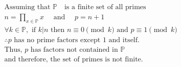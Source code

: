 $$
\begin{aligned}
&\text{Assuming that $\mathbb{P}$ }\text{ is a finite set of all primes} \\
&n = \prod_{x \in \mathbb{P}}^{} x \quad \text{ and } \quad p = n+1 \\
&\forall k \in \mathbb{P}, \text{ if } k | n \text{ then } n \equiv 0 \pmod{k} \text{ and } p \equiv 1 \pmod{k} \\
&\therefore p \text{ has no prime factors except 1 and itself.} \\
&\text{Thus, } p \text{ has factors not contained in } \mathbb{P} \\
&\text{and therefore, the set of primes is not finite.}
\end{aligned}
$$
